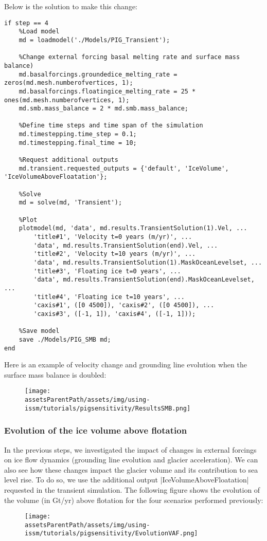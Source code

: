 Below is the solution to make this change:
\begin{lstlisting}
if step == 4
	%Load model
	md = loadmodel('./Models/PIG_Transient');

	%Change external forcing basal melting rate and surface mass balance)
	md.basalforcings.groundedice_melting_rate = zeros(md.mesh.numberofvertices, 1);
	md.basalforcings.floatingice_melting_rate = 25 * ones(md.mesh.numberofvertices, 1);
	md.smb.mass_balance = 2 * md.smb.mass_balance;

	%Define time steps and time span of the simulation
	md.timestepping.time_step = 0.1;
	md.timestepping.final_time = 10;

	%Request additional outputs
	md.transient.requested_outputs = {'default', 'IceVolume', 'IceVolumeAboveFloatation'};

	%Solve
	md = solve(md, 'Transient');

	%Plot
	plotmodel(md, 'data', md.results.TransientSolution(1).Vel, ...
		'title#1', 'Velocity t=0 years (m/yr)', ...
		'data', md.results.TransientSolution(end).Vel, ...
		'title#2', 'Velocity t=10 years (m/yr)', ...
		'data', md.results.TransientSolution(1).MaskOceanLevelset, ...
		'title#3', 'Floating ice t=0 years', ...
		'data', md.results.TransientSolution(end).MaskOceanLevelset, ...
		'title#4', 'Floating ice t=10 years', ...
		'caxis#1', ([0 4500]), 'caxis#2', ([0 4500]), ...
		'caxis#3', ([-1, 1]), 'caxis#4', ([-1, 1]));

	%Save model
	save ./Models/PIG_SMB md;
end
\end{lstlisting}

Here is an example of velocity change and grounding line evolution when the surface mass balance is doubled:
\begin{figure}[H]
	\begin{center}
		\texttt{[image: \\assetsParentPath/assets/img/using-issm/tutorials/pigsensitivity/ResultsSMB.png]}
	\end{center}
\end{figure}
\subsubsection{Evolution of the ice volume above flotation} %
In the previous steps, we investigated the impact of changes in external forcings on ice flow dynamics (grounding line evolution and glacier acceleration). We can also see how these changes impact the glacier volume and its contribution to sea level rise. To do so, we use the additional output \lstinlinebg|IceVolumeAboveFloatation| requested in the transient simulation. The following figure shows the evolution of the volume (in Gt/yr) above flotation for the four scenarios performed previously:
\begin{figure}[H]
	\begin{center}
		\texttt{[image: \\assetsParentPath/assets/img/using-issm/tutorials/pigsensitivity/EvolutionVAF.png]}
	\end{center}
\end{figure}

\clearpage %
